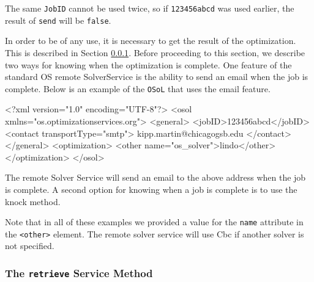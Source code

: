 \documentclass[11pt]{article}
\renewcommand{\_}{{\char"5F}}
\renewcommand{\{}{{\char"7B}}
\renewcommand{\}}{{\char"7D}}
\renewcommand{\^}{{\char"0D}}
\renewcommand{\'}{{\char"0D}}
\begin{document}
The same {\tt JobID} cannot be used twice, so if {\tt 123456abcd} was used earlier, the result of {\tt send} will be {\tt false}.

In order to be of any use, it is necessary to get the result of the optimization. This is described in Section \ref{section:retrieve}. Before proceeding to this section, we describe two ways for knowing when the optimization is complete. One feature of the standard OS remote SolverService is the ability to send an email when the job is complete. Below is an example of the {\tt OSoL} that uses the email feature.
\begin{verbatimtab}[4]
<?xml version="1.0" encoding="UTF-8"?>
<osol xmlns="os.optimizationservices.org">
 	<general>
 		<jobID>123456abcd</jobID>
 		<contact transportType="smtp">
			kipp.martin@chicagogsb.edu
		</contact>
	</general>
    <optimization>
    	<other name="os_solver">lindo</other>
    </optimization>
</osol>
\end{verbatimtab}

The remote Solver Service will send an email to the above address when the job is complete. A second option for knowing when a job is complete is to use the knock method.

Note that in all of these examples we provided a value for the {\tt name} attribute in the {\tt <other>} element. The remote solver service will use Cbc if another solver is not specified.



\subsubsection{The  {\tt retrieve} Service Method}\label{section:retrieve}
\end{document}
